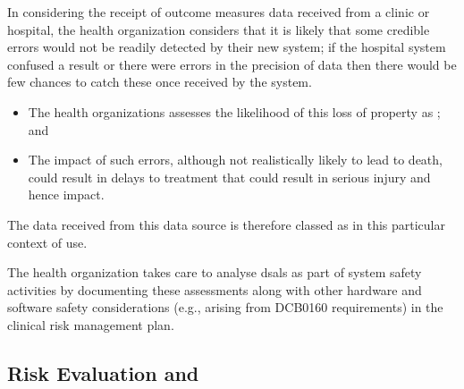 In considering the receipt of outcome measures data received from a clinic or hospital, the health organization considers that it is likely that some credible errors would not be readily detected by their new system; if the hospital system confused a result or there were errors in the precision of data then there would be few chances to catch these once received by the system.
\begin{itemize}
  \item The health organizations assesses the likelihood of this loss of property as ; and
  \item The impact of such errors, although not realistically likely to lead to death, could result in delays to treatment that could result in serious injury and hence  impact.
\end{itemize}

The data received from this data source is therefore classed as  in this particular context of use.

The health organization takes care to analyse \glspl{dsal} as part of system safety activities by documenting these assessments along with other hardware and software safety considerations (e.g., arising from DCB0160 requirements) in the clinical risk management plan.

\subsection{Risk Evaluation and }

